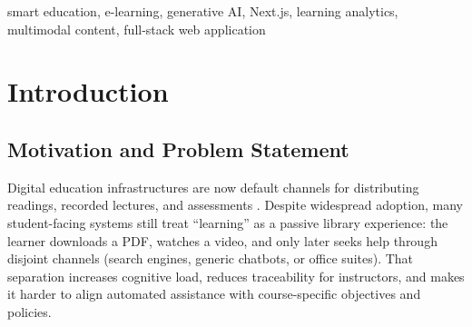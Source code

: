 \documentclass[conference]{IEEEtran}
\begin{document}
\begin{abstract}
Conventional learning management workflows often separate content consumption from intelligent assistance, forcing learners to leave the study context for summarization, practice generation, drafting, or visualization. This paper presents the design and implementation of a smart education platform that integrates multilingual subject delivery (curated file and video catalogs), instructor publishing, learning analytics, and embedded generative AI within a single modern web application. The implementation follows a Next.js App Router architecture with MongoDB persistence, Cloudinary-backed media delivery, password hashing and JSON Web Token sessions (including HttpOnly cookies for selected server routes), and optional Google OAuth. Generative capabilities---including reading summarization, quiz generation from extracted PDF text, instructional diagram synthesis via Mermaid, email drafting, and speech-oriented assistance---are executed through server-side Route Handlers using a Google Gemini--centric model stack with ordered fallbacks and bounded in-memory caching; optional Stability SDXL text-to-image generation supports creative assets. Gamification primitives (XP, levels, badges) and activity logs underpin dashboards and leaderboards. We describe representative functional validation, qualitative observations from supervised walkthroughs, and illustrative latency measurements suitable for capstone-level evaluation, and we discuss limitations related to provider dependence, assessment integrity, and deployment hardening.
\end{abstract}

\begin{IEEEkeywords}
smart education, e-learning, generative AI, Next.js, learning analytics, multimodal content, full-stack web application
\end{IEEEkeywords}

\section{Introduction}

\subsection{Motivation and Problem Statement}

Digital education infrastructures are now default channels for distributing readings, recorded lectures, and assessments \cite{b9}. Despite widespread adoption, many student-facing systems still treat ``learning'' as a passive library experience: the learner downloads a PDF, watches a video, and only later seeks help through disjoint channels (search engines, generic chatbots, or office suites). That separation increases cognitive load, reduces traceability for instructors, and makes it harder to align automated assistance with course-specific objectives and policies.
\end{document}

